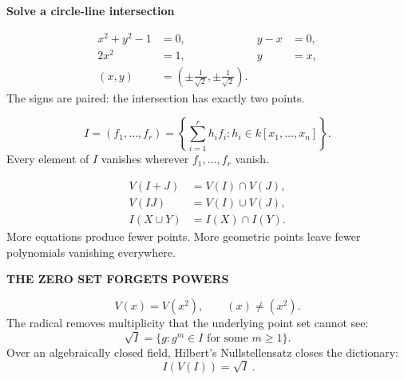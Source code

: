 \documentclass[9pt,a4paper]{extarticle}
\newcommand{\kk}{k}
\newcommand{\eyebrow}[1]{{\fontsize{7.2}{8}\selectfont\bfseries\color{teal}\MakeUppercase{#1}}}
\begin{document}
\begin{minipage}[t]{.46\textwidth}
\begin{quietbox}
\textbf{Solve a circle-line intersection}\par\vspace{3pt}
\begin{center}
\end{center}
\begin{align*}
x^2+y^2-1&=0, & y-x&=0,\\
2x^2&=1, & y&=x,\\
(x,y)&=\left(\pm\frac1{\sqrt2},\pm\frac1{\sqrt2}\right).
\end{align*}
The signs are paired: the intersection has exactly two points.
\end{quietbox}
\end{minipage}\hfill
\begin{minipage}[t]{.50\textwidth}
\begin{mathbox}
\[
I=(f_1,\ldots,f_r)
=\left\{\sum_{i=1}^{r}h_i f_i:h_i\in\kk[x_1,\ldots,x_n]\right\}.
\]
Every element of $I$ vanishes wherever $f_1,\ldots,f_r$ vanish.
\end{mathbox}
\vspace{5pt}
\begin{align*}
V(I+J)&=V(I)\cap V(J),\\
V(IJ)&=V(I)\cup V(J),\\
I(X\cup Y)&=I(X)\cap I(Y).
\end{align*}
More equations produce fewer points. More geometric points leave fewer polynomials vanishing everywhere.
\end{minipage}

\vspace{6pt}
\begin{coralbox}
\eyebrow{The zero set forgets powers}\par\vspace{2pt}
\[
V(x)=V(x^2),\qquad (x)\neq(x^2).
\]
The radical removes multiplicity that the underlying point set cannot see:
\[
\sqrt I=\{g:g^m\in I\text{ for some }m\ge1\}.
\]
Over an algebraically closed field, Hilbert's Nullstellensatz closes the dictionary:
\[
\boxed{\ I(V(I))=\sqrt I\ }.
\]
\end{coralbox}
\end{document}
